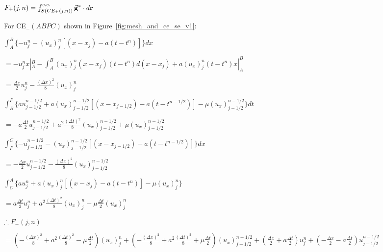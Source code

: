 \documentclass[a4paper,12pt]{article}
\begin{document}
\begin{enumerate}
        \hspace{4mm}$F_{\pm}(j,n)=\oint^{c.c.}_{S(CE_{\pm}(j,n))}\vec{\bf{g}}^{*}\cdot d{\bf{r}}$

        \hspace{4mm}For CE$_{-}(ABPC)$ shown in Figure~\ref{fig:mesh_and_ce_se_v1}:

        \hspace{8mm}$\int^{B}_{A}\{-u^{n}_{j}-(u_{x})^{n}_{j}[(x-x_{j})-a(t-t^{n})]\}dx$

        \hspace{10mm}$= -u^{n}_{j}x|^{B}_{A}-\int^{B}_{A}(u_{x})^{n}_{j}(x-x_{j})(t-t^{n})d(x-x_{j})+a(u_{x})^{n}_{j}(t-t^{n})x|^{B}_{A}$

        \hspace{10mm}$=\frac{\Delta x}{2}u^{n}_{j}-\frac{(\Delta x)^{2}}{8}(u_{x})^{n}_{j}$

        \hspace{8mm}$\int^{P}_{B}\{au^{n-1/2}_{j-1/2}+a(u_{x})^{n-1/2}_{j-1/2}[(x-x_{j-1/2})-a(t-t^{n-1/2})]-\mu(u_{x})^{n-1/2}_{j-1/2}\}dt$

        \hspace{10mm}$=-a\frac{\Delta t}{2}u^{n-1/2}_{j-1/2}+a^{2}\frac{(\Delta t)^{2}}{8}(u_{x})^{n-1/2}_{j-1/2}+\mu(u_{x})^{n-1/2}_{j-1/2}$

        \hspace{8mm}$\int^{C}_{P}\{-u^{n-1/2}_{j-1/2}-(u_{x})^{n-1/2}_{j-1/2}[(x-x_{j-1/2})-a(t-t^{n-1/2})]\}dx$

        \hspace{10mm}$=-\frac{\Delta x}{2}u^{n-1/2}_{j-1/2}-\frac{(\Delta x)^{2}}{8}(u_{x})^{n-1/2}_{j-1/2}$

        \hspace{8mm}$\int^{A}_{C}\{au^{n}_{j}+a(u_{x})^{n}_{j}[(x-x_{j})-a(t-t^{n})]-\mu(u_{x})^{n}_{j}\}$

        \hspace{10mm}$=a\frac{\Delta t}{2}u^{n}_{j}+a^{2}\frac{(\Delta t)^{2}}{8}(u_{x})^{n}_{j}-\mu\frac{\Delta t}{2}(u_{x})^{n}_{j}$

        \hspace{4mm}${}_\cdot{}^\cdot{}_\cdot~F_{-}(j,n)$
        
        \hspace{6mm}$=(-\frac{(\Delta x)^{2}}{8}+a^{2}\frac{(\Delta t)^{2}}{8}-\mu\frac{\Delta t}{2})(u_{x})^{n}_{j}+(-\frac{(\Delta x)^{2}}{8}+a^{2}\frac{(\Delta t)^{2}}{8}+\mu\frac{\Delta t}{2})(u_{x})^{n-1/2}_{j-1/2}+(\frac{\Delta x}{2}+a\frac{\Delta t}{2})u^{n}_{j}+(-\frac{\Delta x}{2}-a\frac{\Delta t}{2})u^{n-1/2}_{j-1/2}$


\end{enumerate}
\end{document}

